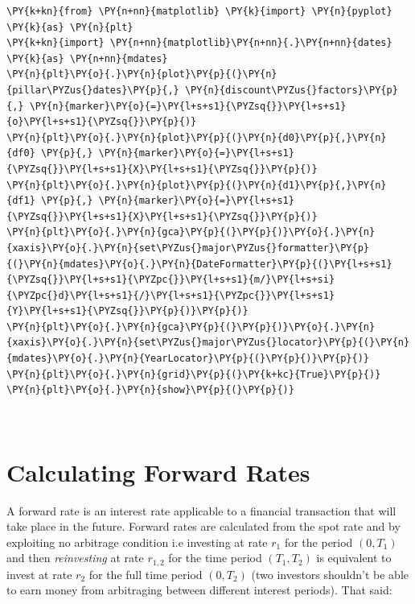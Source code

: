 \begin{tcolorbox}[breakable, size=fbox, boxrule=1pt, pad at break*=1mm,colback=cellbackground, colframe=cellborder]
\begin{Verbatim}[commandchars=\\\{\}]
\PY{k+kn}{from} \PY{n+nn}{matplotlib} \PY{k}{import} \PY{n}{pyplot} \PY{k}{as} \PY{n}{plt}
\PY{k+kn}{import} \PY{n+nn}{matplotlib}\PY{n+nn}{.}\PY{n+nn}{dates} \PY{k}{as} \PY{n+nn}{mdates}
\PY{n}{plt}\PY{o}{.}\PY{n}{plot}\PY{p}{(}\PY{n}{pillar\PYZus{}dates}\PY{p}{,} \PY{n}{discount\PYZus{}factors}\PY{p}{,} \PY{n}{marker}\PY{o}{=}\PY{l+s+s1}{\PYZsq{}}\PY{l+s+s1}{o}\PY{l+s+s1}{\PYZsq{}}\PY{p}{)}
\PY{n}{plt}\PY{o}{.}\PY{n}{plot}\PY{p}{(}\PY{n}{d0}\PY{p}{,}\PY{n}{df0} \PY{p}{,} \PY{n}{marker}\PY{o}{=}\PY{l+s+s1}{\PYZsq{}}\PY{l+s+s1}{X}\PY{l+s+s1}{\PYZsq{}}\PY{p}{)}
\PY{n}{plt}\PY{o}{.}\PY{n}{plot}\PY{p}{(}\PY{n}{d1}\PY{p}{,}\PY{n}{df1} \PY{p}{,} \PY{n}{marker}\PY{o}{=}\PY{l+s+s1}{\PYZsq{}}\PY{l+s+s1}{X}\PY{l+s+s1}{\PYZsq{}}\PY{p}{)}
\PY{n}{plt}\PY{o}{.}\PY{n}{gca}\PY{p}{(}\PY{p}{)}\PY{o}{.}\PY{n}{xaxis}\PY{o}{.}\PY{n}{set\PYZus{}major\PYZus{}formatter}\PY{p}{(}\PY{n}{mdates}\PY{o}{.}\PY{n}{DateFormatter}\PY{p}{(}\PY{l+s+s1}{\PYZsq{}}\PY{l+s+s1}{\PYZpc{}}\PY{l+s+s1}{m/}\PY{l+s+si}{\PYZpc{}d}\PY{l+s+s1}{/}\PY{l+s+s1}{\PYZpc{}}\PY{l+s+s1}{Y}\PY{l+s+s1}{\PYZsq{}}\PY{p}{)}\PY{p}{)}
\PY{n}{plt}\PY{o}{.}\PY{n}{gca}\PY{p}{(}\PY{p}{)}\PY{o}{.}\PY{n}{xaxis}\PY{o}{.}\PY{n}{set\PYZus{}major\PYZus{}locator}\PY{p}{(}\PY{n}{mdates}\PY{o}{.}\PY{n}{YearLocator}\PY{p}{(}\PY{p}{)}\PY{p}{)}
\PY{n}{plt}\PY{o}{.}\PY{n}{grid}\PY{p}{(}\PY{k+kc}{True}\PY{p}{)}
\PY{n}{plt}\PY{o}{.}\PY{n}{show}\PY{p}{(}\PY{p}{)}
\end{Verbatim}
\end{tcolorbox}

\begin{center}
\end{center}
    { \hspace*{\fill} \\}

\section{Calculating Forward Rates}\label{calculating-forward-rates}

A forward rate is an interest rate applicable to a financial transaction that will take place in the future. Forward rates are calculated from the spot rate and by exploiting no arbitrage condition i.e investing at rate \(r_1\) for the period \((0, T_1)\) and then \emph{reinvesting} at rate \(r_{1,2}\) for the time period \((T_1, T_2)\) is equivalent to invest at rate \(r_2\) for the full time period \((0, T_2)\) (two investors shouldn't be able to earn money from arbitraging between different interest periods). That said:

